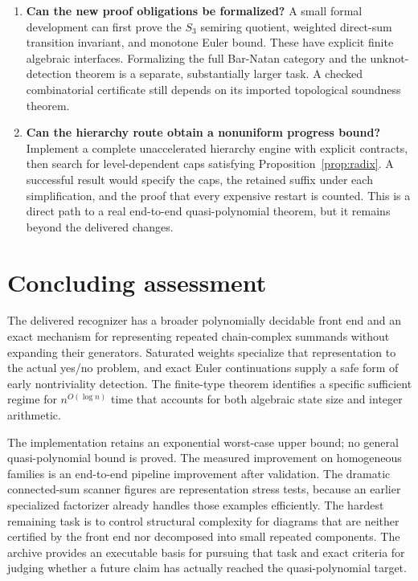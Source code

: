 \begin{enumerate}[label=\textbf{Q\arabic*.},leftmargin=*]
\item \textbf{Can the new proof obligations be formalized?}
A small formal development can first prove the $S_3$ semiring quotient,
weighted direct-sum transition invariant, and monotone Euler bound. These
have explicit finite algebraic interfaces. Formalizing the full
Bar-Natan category and the unknot-detection theorem is a separate,
substantially larger task. A checked combinatorial certificate still depends
on its imported topological soundness theorem.

\item \textbf{Can the hierarchy route obtain a nonuniform progress bound?}
Implement a complete unaccelerated hierarchy engine with explicit contracts,
then search for level-dependent caps satisfying
Proposition~\ref{prop:radix}. A successful result would specify the caps,
the retained suffix under each simplification, and the proof that every
expensive restart is counted. This is a direct path to a real end-to-end
quasi-polynomial theorem, but it remains beyond the delivered changes.
\end{enumerate}

\section{Concluding assessment}
The delivered recognizer has a broader polynomially decidable front end and
an exact mechanism for representing repeated chain-complex summands without
expanding their generators. Saturated weights specialize that representation
to the actual yes/no problem, and exact Euler continuations supply a safe
form of early nontriviality detection. The finite-type theorem identifies a
specific sufficient regime for $n^{O(\log n)}$ time that accounts for both
algebraic state size and integer arithmetic.

The implementation retains an exponential worst-case upper bound; no general
quasi-polynomial bound is proved. The
measured improvement on homogeneous families is an end-to-end pipeline
improvement after validation. The dramatic connected-sum scanner figures
are representation stress tests, because an earlier specialized factorizer
already handles those examples efficiently. The hardest remaining task is
to control structural complexity for diagrams that are neither certified by
the front end nor decomposed into small repeated components. The archive
provides an executable basis for pursuing that task and exact criteria for
judging whether a future claim has actually reached the quasi-polynomial
target.
